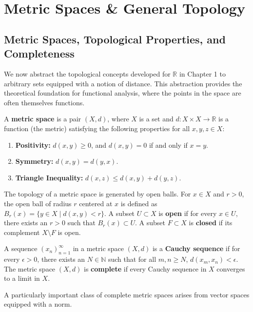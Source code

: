 \section{Metric Spaces \& General Topology}

\subsection{Metric Spaces, Topological Properties, and Completeness}

We now abstract the topological concepts developed for $\mathbb{R}$ in Chapter 1 to arbitrary sets equipped with a notion of distance. This abstraction provides the theoretical foundation for functional analysis, where the points in the space are often themselves functions.

\begin{definition}
A \textbf{metric space} is a pair $(X, d)$, where $X$ is a set and $d: X \times X \to \mathbb{R}$ is a function (the metric) satisfying the following properties for all $x, y, z \in X$:
\begin{enumerate}
    \item \textbf{Positivity:} $d(x, y) \ge 0$, and $d(x, y) = 0$ if and only if $x = y$.
    \item \textbf{Symmetry:} $d(x, y) = d(y, x)$.
    \item \textbf{Triangle Inequality:} $d(x, z) \le d(x, y) + d(y, z)$.
\end{enumerate}
\end{definition}

The topology of a metric space is generated by open balls. For $x \in X$ and $r > 0$, the open ball of radius $r$ centered at $x$ is defined as $B_r(x) = \{ y \in X \mid d(x, y) < r \}$. A subset $U \subset X$ is \textbf{open} if for every $x \in U$, there exists an $r > 0$ such that $B_r(x) \subset U$. A subset $F \subset X$ is \textbf{closed} if its complement $X \setminus F$ is open.

\begin{definition}
A sequence $(x_n)_{n=1}^\infty$ in a metric space $(X, d)$ is a \textbf{Cauchy sequence} if for every $\epsilon > 0$, there exists an $N \in \mathbb{N}$ such that for all $m, n \ge N$, $d(x_m, x_n) < \epsilon$. The metric space $(X, d)$ is \textbf{complete} if every Cauchy sequence in $X$ converges to a limit in $X$. 
\end{definition}

A particularly important class of complete metric spaces arises from vector spaces equipped with a norm.

